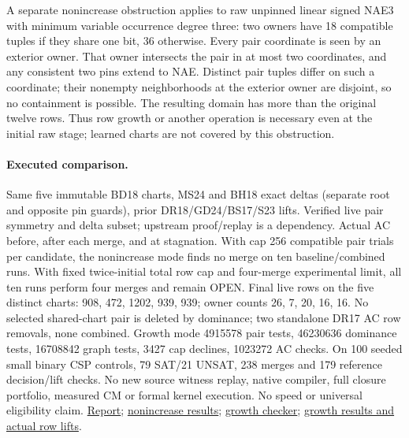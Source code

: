\documentclass[11pt]{article}
\begin{document}
A separate nonincrease obstruction applies to raw unpinned linear signed NAE3 with minimum variable occurrence degree three: two owners have 18 compatible tuples if they share one bit, 36 otherwise. Every pair coordinate is seen by an exterior owner. That owner intersects the pair in at most two coordinates, and any consistent two pins extend to NAE. Distinct pair tuples differ on such a coordinate; their nonempty neighborhoods at the exterior owner are disjoint, so no containment is possible. The resulting domain has more than the original twelve rows. Thus row growth or another operation is necessary even at the initial raw stage; learned charts are not covered by this obstruction.
\paragraph{Executed comparison.} Same five immutable BD18 charts, MS24 and BH18 exact deltas (separate root and opposite pin guards), prior DR18/GD24/BS17/S23 lifts. Verified live pair symmetry and delta subset; upstream proof/replay is a dependency. Actual AC before, after each merge, and at stagnation. With cap 256 compatible pair trials per candidate, the nonincrease mode finds no merge on ten baseline/combined runs. With fixed twice-initial total row cap and four-merge experimental limit, all ten runs perform four merges and remain OPEN. Final live rows on the five distinct charts: 908, 472, 1202, 939, 939; owner counts 26, 7, 20, 16, 16. No selected shared-chart pair is deleted by dominance; two standalone DR17 AC row removals, none combined. Growth mode 4915578 pair tests, 46230636 dominance tests, 16708842 graph tests, 3427 cap declines, 1023272 AC checks. On 100 seeded small binary CSP controls, 79 SAT/21 UNSAT, 238 merges and 179 reference decision/lift checks. No new source witness replay, native compiler, full closure portfolio, measured CM or formal kernel execution. No speed or universal eligibility claim. \href{https://github.com/j15marti/pnp/commit/c3e7c258cdd99f17aca1bd328de9930a91ea0133}{Report}; \href{https://github.com/j15marti/pnp/commit/16f8cf4d9a1aa45bd44d76b2acc81860b9432757}{nonincrease results}; \href{https://github.com/j15marti/pnp/commit/206acaf61155fa806cd17029f9cc6f05d2312828}{growth checker}; \href{https://github.com/j15marti/pnp/commit/5ff7e85d628feff01eb5853881093b68a7de86bc}{growth results and actual row lifts}.
\end{document}
